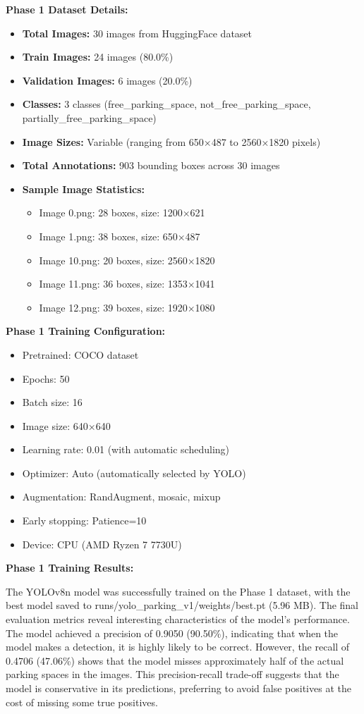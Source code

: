 \documentclass[12pt,a4paper]{article}
\begin{document}
\textbf{Phase 1 Dataset Details:}
\begin{itemize}
    \item \textbf{Total Images:} 30 images from HuggingFace dataset
    \item \textbf{Train Images:} 24 images (80.0\%)
    \item \textbf{Validation Images:} 6 images (20.0\%)
    \item \textbf{Classes:} 3 classes (free\_parking\_space, not\_free\_parking\_space, partially\_free\_parking\_space)
    \item \textbf{Image Sizes:} Variable (ranging from 650×487 to 2560×1820 pixels)
    \item \textbf{Total Annotations:} 903 bounding boxes across 30 images
    \item \textbf{Sample Image Statistics:}
    \begin{itemize}
        \item Image 0.png: 28 boxes, size: 1200×621
        \item Image 1.png: 38 boxes, size: 650×487
        \item Image 10.png: 20 boxes, size: 2560×1820
        \item Image 11.png: 36 boxes, size: 1353×1041
        \item Image 12.png: 39 boxes, size: 1920×1080
    \end{itemize}
\end{itemize}

\textbf{Phase 1 Training Configuration:}
\begin{itemize}
    \item Pretrained: COCO dataset
    \item Epochs: 50
    \item Batch size: 16
    \item Image size: 640×640
    \item Learning rate: 0.01 (with automatic scheduling)
    \item Optimizer: Auto (automatically selected by YOLO)
    \item Augmentation: RandAugment, mosaic, mixup
    \item Early stopping: Patience=10
    \item Device: CPU (AMD Ryzen 7 7730U)
\end{itemize}

\textbf{Phase 1 Training Results:}

The YOLOv8n model was successfully trained on the Phase 1 dataset, with the best model saved to runs/yolo\_parking\_v1/weights/best.pt (5.96 MB). The final evaluation metrics reveal interesting characteristics of the model's performance. The model achieved a precision of 0.9050 (90.50\%), indicating that when the model makes a detection, it is highly likely to be correct. However, the recall of 0.4706 (47.06\%) shows that the model misses approximately half of the actual parking spaces in the images. This precision-recall trade-off suggests that the model is conservative in its predictions, preferring to avoid false positives at the cost of missing some true positives.
\end{document}
